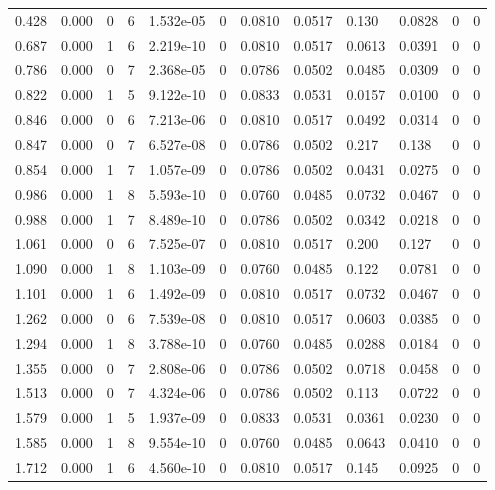 \documentclass[preview]{standalone}
\begin{document}
{{\begin{tabular}{L{1.2cm}C{1.2cm} C{0.3cm}C{0.5cm} C{1.4cm}C{1.4cm} C{1.4cm}C{1.4cm} C{1.6cm}C{1.6cm} C{1.6cm}C{1.6cm}}
  0.428  &  0.000  & 0     &  6 &  1.532e-05  & 0  &  0.0810&   0.0517& 0.130 & 0.0828   &  0 & 0  \\ 
  0.687  &  0.000  & 1     &  6 &  2.219e-10  & 0  &  0.0810&   0.0517& 0.0613 & 0.0391   &  0 & 0  \\ 
  0.786  &  0.000  & 0     &  7 &  2.368e-05  & 0  &  0.0786&   0.0502& 0.0485 & 0.0309   &  0 & 0  \\ 
  0.822  &  0.000  & 1     &  5 &  9.122e-10  & 0  &  0.0833&   0.0531& 0.0157 & 0.0100   &  0 & 0  \\ 
  0.846  &  0.000  & 0     &  6 &  7.213e-06  & 0  &  0.0810&   0.0517& 0.0492 & 0.0314   &  0 & 0  \\ 
  0.847  &  0.000  & 0     &  7 &  6.527e-08  & 0  &  0.0786&   0.0502& 0.217 & 0.138   &  0 & 0  \\ 
  0.854  &  0.000  & 1     &  7 &  1.057e-09  & 0  &  0.0786&   0.0502& 0.0431 & 0.0275   &  0 & 0  \\ 
  0.986  &  0.000  & 1     &  8 &  5.593e-10  & 0  &  0.0760&   0.0485& 0.0732 & 0.0467   &  0 & 0  \\ 
  0.988  &  0.000  & 1     &  7 &  8.489e-10  & 0  &  0.0786&   0.0502& 0.0342 & 0.0218   &  0 & 0  \\ 
  1.061  &  0.000  & 0     &  6 &  7.525e-07  & 0  &  0.0810&   0.0517& 0.200 & 0.127   &  0 & 0  \\ 
  1.090  &  0.000  & 1     &  8 &  1.103e-09  & 0  &  0.0760&   0.0485& 0.122 & 0.0781   &  0 & 0  \\ 
  1.101  &  0.000  & 1     &  6 &  1.492e-09  & 0  &  0.0810&   0.0517& 0.0732 & 0.0467   &  0 & 0  \\ 
  1.262  &  0.000  & 0     &  6 &  7.539e-08  & 0  &  0.0810&   0.0517& 0.0603 & 0.0385   &  0 & 0  \\ 
  1.294  &  0.000  & 1     &  8 &  3.788e-10  & 0  &  0.0760&   0.0485& 0.0288 & 0.0184   &  0 & 0  \\ 
  1.355  &  0.000  & 0     &  7 &  2.808e-06  & 0  &  0.0786&   0.0502& 0.0718 & 0.0458   &  0 & 0  \\ 
  1.513  &  0.000  & 0     &  7 &  4.324e-06  & 0  &  0.0786&   0.0502& 0.113 & 0.0722   &  0 & 0  \\ 
  1.579  &  0.000  & 1     &  5 &  1.937e-09  & 0  &  0.0833&   0.0531& 0.0361 & 0.0230   &  0 & 0  \\ 
  1.585  &  0.000  & 1     &  8 &  9.554e-10  & 0  &  0.0760&   0.0485& 0.0643 & 0.0410   &  0 & 0  \\ 
  1.712  &  0.000  & 1     &  6 &  4.560e-10  & 0  &  0.0810&   0.0517& 0.145 & 0.0925   &  0 & 0  \\ 

\end{tabular}}}
\end{document}
